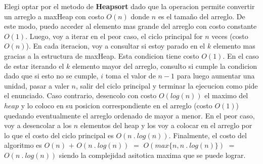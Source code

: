\documentclass[10pt,a4paper]{article}
\begin{document}
Elegi optar por el metodo de \textbf{Heapsort} dado que la operacion  permite convertir un arreglo a maxHeap con costo $O(n)$ donde $n$ es el tamaño del arreglo. De este modo, puedo acceder al elemento mas grande del arreglo con costo constante $O(1)$. 
\newline
\newline
Luego, voy a iterar en el peor caso, el ciclo principal for $n$ veces (costo $O(n)$). En cada iteracion, voy a consultar si estoy parado en el $k$ elemento mas gracias a la estructura de maxHeap. Esta condicion tiene costo $O(1)$. En el caso de estar iterando el $k$ elemento mayor del arreglo, consulto si cumple la condicion  dado que si esto no se cumple, $i$ toma el valor de $n-1$ para luego aumentar una unidad, pasar a valer $n$, salir del ciclo principal y terminar la ejecucion como pide el enunciado. Caso contrario, desencolo con costo $O(log(n))$ el maximo del $heap$ y lo coloco en su posicion correspondiente en el arreglo (costo $O(1)$) quedando eventualmente el arreglo ordenado de mayor a menor.
\newline
\newline
En el peor caso, voy a desencolar a los $n$ elementos del heap y los voy a colocar en el arreglo por lo que el costo del ciclo principal es $O(n ~.~ log(n))$. 
\newline
\newline
Finalmente, el costo del algoritmo es $O(n)$ $+$ $O(n ~.~ log(n))$ $=$ $O(max\{n,n ~.~ log(n)\})$ $=$ $O(n ~.~ log(n))$ siendo la complejidad asitotica maxima que se puede lograr. 
\newpage
\end{document}
